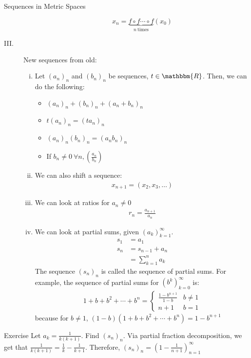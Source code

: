 \documentclass[10pt]{extarticle}
\newcommand{\R}{\mathbbm{R}}
\begin{document}
\begin{problem}{Sequences in Metric Spaces}
\begin{description}
\begin{enumerate}[(i)]
            \[x_n = \underbrace{f\circ f\cdots \circ f}_{n~\text{times}}(x_0)\]
        \end{enumerate}
      \item[III.] New sequences from old: 
        \begin{enumerate}[(i)]
          \item Let $(a_n)_n$ and $(b_n)_n$ be sequences, $t\in\R$. Then, we can do the following:
            \begin{itemize}
              \item $(a_n)_n + (b_n)_n + (a_n + b_n)_n$
              \item $t(a_n)_n = (ta_n)_n$
              \item $(a_n)_n(b_n)_n = (a_nb_n)_n$
              \item If $b_n \neq 0~\forall n, \left(\frac{a_n}{b_n}\right)$
            \end{itemize}
          \item We can also shift a sequence:
            \begin{align*}
              x_{n+1} = (x_2,x_3,\dots)
            \end{align*}
          \item We can look at ratios for $a_n\neq 0$
            \begin{align*}
              r_n = \frac{a_{n+1}}{a_n}
            \end{align*}
          \item We can look at partial sums, given $(a_k)_{k=1}^{\infty}$.
            \begin{align*}
              s_1 &= a_1\\
              s_n &= s_{n-1} + a_n\\
                  &= \sum_{k=1}^{n}a_k
            \end{align*}
            The sequence $(s_n)_n$ is called the sequence of partial sums. For example, the sequence of partial sums for $(b^k)_{k=0}^{\infty}$ is:
            \begin{align*}
              1 + b + b^2 + \cdots + b^n = \begin{cases}
                \frac{1-b^{n+1}}{1-b}&b\neq 1\\
                n+1&b=1
              \end{cases}
            \end{align*}
            because for $b \neq 1$, $(1-b)(1+b+b^2+\cdots+b^n) = 1-b^{n+1}$
        \end{enumerate}
    \end{description}
    \begin{problem}{Exercise}
      Let $a_k = \frac{1}{k(k+1)}$. Find $(s_n)_n$.
      \tcblower
      Via partial fraction decomposition, we get that $\frac{1}{k(k+1)} = \frac{1}{k}-\frac{1}{k+1}$. Therefore, $(s_n)_n = \left(1-\frac{1}{n+1}\right)_{n=1}^{\infty}$
    \end{problem}
  \end{problem}
\end{document}
